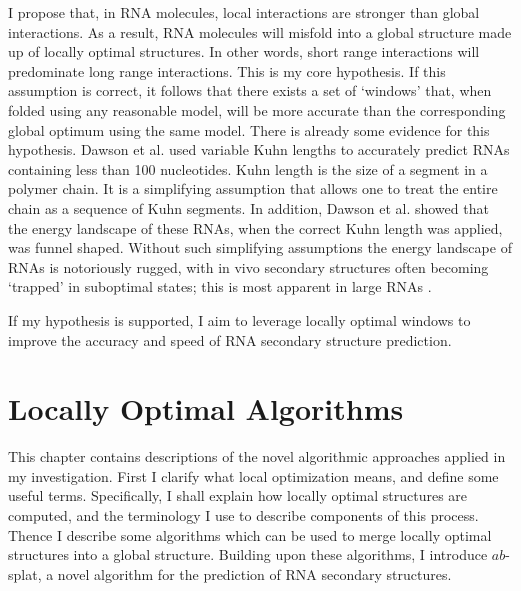 \documentclass{cshonours}
\begin{document}
I propose that, in RNA molecules, local interactions are stronger than global interactions. As a result, RNA molecules will misfold into a global structure made up of locally optimal structures. In other words, short range interactions will predominate long range interactions. This is my core hypothesis. If this assumption is correct, it follows that there exists a set of `windows' that, when folded using any reasonable model, will be more accurate than the corresponding global optimum using the same model. There is already some evidence for this hypothesis. Dawson et al. \cite{dawson2013new} used variable Kuhn lengths to accurately predict RNAs containing less than 100 nucleotides. Kuhn length is the size of a segment in a polymer chain. It is a simplifying assumption that allows one to treat the entire chain as a sequence of Kuhn segments. In addition, Dawson et al. showed that the energy landscape of these RNAs, when the correct Kuhn length was applied, was funnel shaped. Without such simplifying assumptions the energy landscape of RNAs is notoriously rugged, with in vivo secondary structures often becoming `trapped' in suboptimal states; this is most apparent in large RNAs \cite{ditzler2008rugged}.

If my hypothesis is supported, I aim to leverage locally optimal windows to improve the accuracy and speed of RNA secondary structure prediction.

\chapter{Locally Optimal Algorithms}

This chapter contains descriptions of the novel algorithmic approaches applied in my investigation. First I clarify what local optimization means, and define some useful terms. Specifically, I shall explain how locally optimal structures are computed, and the terminology I use to describe components of this process. Thence I describe some algorithms which can be used to merge locally optimal structures into a global structure. Building upon these algorithms, I introduce $ab$-splat, a novel algorithm for the prediction of RNA secondary structures.
\end{document}
